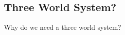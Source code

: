 \begin{abstrsyn}
\subsection {Three World System?}

Why do we need a three world system?

\end{abstrsyn}



